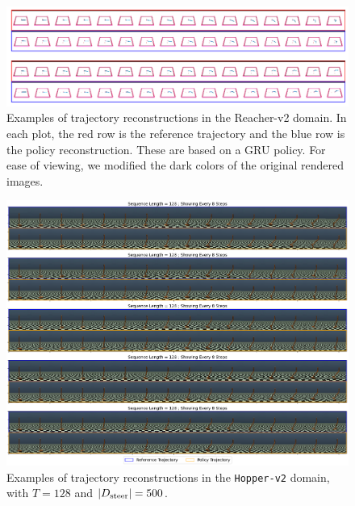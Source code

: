 \documentclass[nohyperref]{article}
\begin{document}
\begin{figure}
    \centering
    \includegraphics[width=\textwidth,keepaspectratio]{figures/reacher_random_to_random_examples_white.png}
    \caption{Examples of trajectory reconstructions in the Reacher-v2 domain. In each plot, the red row is the reference trajectory and the blue row is the policy reconstruction. These are based on a GRU policy.
    For ease of viewing, we modified the dark colors of the original rendered images. }
    \label{fig:reacher_random_to_random}
\end{figure}

\begin{figure}
    \centering
    \includegraphics[width=\textwidth,keepaspectratio]{figures/iclr_plots/hopper-128-5-trajs.png}
    \vspace{-2em}
    \caption{Examples of trajectory reconstructions in the \texttt{Hopper-v2} domain, with $T=128$ and $|D_{\mathrm{steer}}|=500$. }
    \label{fig:hopper_128_appendix}
    \vspace{-1em}
\end{figure}
\end{document}
